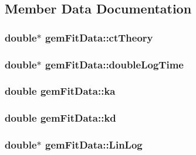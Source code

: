 \subsection{\-Member \-Data \-Documentation}
\hypertarget{structgemFitData_a4ebd510f1710859d25247576bf4741dd}{
\subsubsection[{ct\-Theory}]{\setlength{\rightskip}{0pt plus 5cm}double$\ast$ {\bf gem\-Fit\-Data\-::ct\-Theory}}}\label{structgemFitData_a4ebd510f1710859d25247576bf4741dd}
\hypertarget{structgemFitData_a89d045633c7b56b764955aac0315e4c8}{
\subsubsection[{double\-Log\-Time}]{\setlength{\rightskip}{0pt plus 5cm}double$\ast$ {\bf gem\-Fit\-Data\-::double\-Log\-Time}}}\label{structgemFitData_a89d045633c7b56b764955aac0315e4c8}
\hypertarget{structgemFitData_aca87aa3e7c6b283f1308655cef5d01b3}{
\subsubsection[{ka}]{\setlength{\rightskip}{0pt plus 5cm}double {\bf gem\-Fit\-Data\-::ka}}}\label{structgemFitData_aca87aa3e7c6b283f1308655cef5d01b3}
\hypertarget{structgemFitData_adbda8e4983eb12fec050fdb2acdafd29}{
\subsubsection[{kd}]{\setlength{\rightskip}{0pt plus 5cm}double {\bf gem\-Fit\-Data\-::kd}}}\label{structgemFitData_adbda8e4983eb12fec050fdb2acdafd29}
\hypertarget{structgemFitData_a545989a23e41b3354f21f45bede5cc76}{
\subsubsection[{\-Lin\-Log}]{\setlength{\rightskip}{0pt plus 5cm}double$\ast$ {\bf gem\-Fit\-Data\-::\-Lin\-Log}}}\label{structgemFitData_a545989a23e41b3354f21f45bede5cc76}
